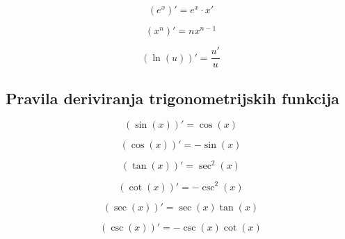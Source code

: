 \begin{propositionbox}
    $$
        (e^x)' = e^x \cdot x'
    $$
\end{propositionbox}

\begin{propositionbox}
    $$
        (x^{n})' = nx^{n-1}
    $$
\end{propositionbox}

\begin{propositionbox}
    $$
        (\ln(u))' = \frac{u'}{u}
    $$
\end{propositionbox}

\subsection{Pravila deriviranja trigonometrijskih funkcija}

\begin{propositionbox}
    $$
        (\sin(x))' = \cos(x)
    $$
\end{propositionbox}

\begin{propositionbox}
    $$
        (\cos(x))' = -\sin(x)
    $$
\end{propositionbox}

\begin{propositionbox}
    $$
        (\tan(x))' = \sec^2(x)
    $$
\end{propositionbox}

\begin{propositionbox}
    $$
        (\cot(x))' = -\csc^2(x)
    $$
\end{propositionbox}

\begin{propositionbox}
    $$
        (\sec(x))' = \sec(x) \tan(x)
    $$
\end{propositionbox}

\begin{propositionbox}
    $$
        (\csc(x))' = -\csc(x) \cot(x)
    $$
\end{propositionbox}
